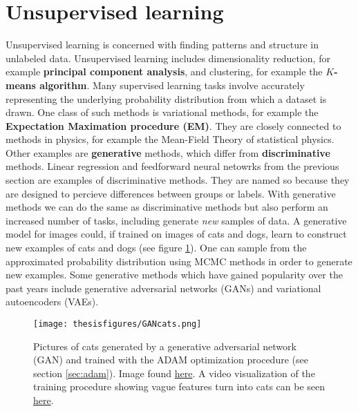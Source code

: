 \documentclass[twoside,english]{uiofysmaster}
\begin{document}
\section{Unsupervised learning}
Unsupervised learning is concerned with finding patterns and structure in unlabeled data. Unsupervised learning includes dimensionality reduction, for example \textbf{principal component analysis}, and clustering, for example the $K$\textbf{-means algorithm}. Many supervised learning tasks involve accurately representing the underlying probability distribution from which a dataset is drawn. One class of such methods is variational methods, for example the \textbf{Expectation Maximation procedure (EM)}. They are closely connected to methods in physics, for example the Mean-Field Theory of statistical physics. Other examples are \textbf{generative} methods, which differ from \textbf{discriminative} methods. Linear regression and feedforward neural netowrks from the previous section are examples of discriminative methods. They are named so because they are designed to percieve differences between groups or labels. With generative methods we can do the same as discriminative methods but also perform an increased number of tasks, including generate \textit{new} samples of data. A generative model for images could, if trained on images of cats and dogs, learn to construct new examples of cats and dogs (see figure \ref{fig:GANcats}). One can sample from the approximated probability distribution using MCMC methods in order to generate new examples. Some generative methods which have gained popularity over the past years include generative adversarial networks (GANs) and variational autoencoders (VAEs).


\begin{figure}
\centering
 \texttt{[image: thesisfigures/GANcats.png]}
 \caption{Pictures of cats generated by a generative adversarial network (GAN) and trained with the ADAM optimization procedure (see section \ref{sec:adam}). Image found \href{https://ajolicoeur.wordpress.com/cats/}{here}. A video visualization of the training procedure showing vague features turn into cats can be seen \href{https://www.youtube.com/watch?v=JRBscukr7ew&feature=youtu.be}{here}.}
 \label{fig:GANcats}
\end{figure}
\end{document}
